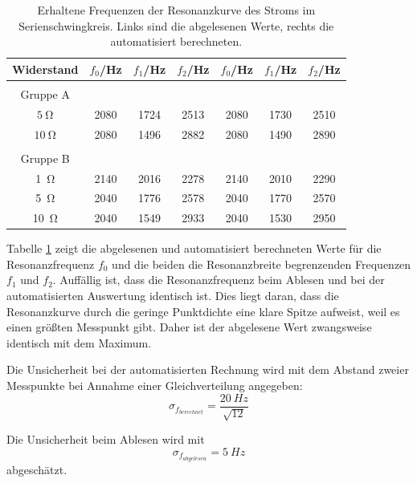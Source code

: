 \documentclass[12pt,a4paper]{article}
\begin{document}
\begin{table}
	\centering
	\begin{tabular}{|c|c|c|c||c|c|c|}
		\hline
		Widerstand & $f_0$/Hz & $f_1$/Hz & $f_2$/Hz & $f_0$/Hz & $f_1$/Hz & $f_2$/Hz \\
		\hline
		&&&&&&\\
		Gruppe A &&&&&&\\
		\hline
		$\SI{5}{\ohm}$ & 2080 & 1724 & 2513 & 2080 & 1730 & 2510 \\
		\hline
		$\SI{10}{\ohm}$ & 2080 & 1496 & 2882 & 2080 & 1490 & 2890 \\
		\hline
		&&&&&&\\
		Gruppe B &&&&&&\\
		\hline
		\SI{1}{\ohm} & 2140 & 2016 & 2278 & 2140 & 2010 & 2290 \\
		\hline
		\SI{5}{\ohm} & 2040 & 1776 & 2578 & 2040 & 1770 & 2570 \\
		\hline
		\SI{10}{\ohm} & 2040 & 1549 & 2933 & 2040 & 1530 & 2950 \\
		\hline
	\end{tabular}
	\caption{Erhaltene Frequenzen der Resonanzkurve des Stroms im Serienschwingkreis. Links sind die abgelesenen Werte, rechts die automatisiert berechneten.}
	\label{tab:StromResonanz}
\end{table}


Tabelle \ref{tab:StromResonanz} zeigt die abgelesenen und automatisiert berechneten Werte für die Resonanzfrequenz $f_0$ und die beiden die Resonanzbreite begrenzenden Frequenzen $f_1$ und $f_2$. Auffällig ist, dass die Resonanzfrequenz beim Ablesen und bei der automatisierten Auswertung identisch ist. Dies liegt daran, dass die Resonanzkurve durch die geringe Punktdichte eine klare Spitze aufweist, weil es einen größten Messpunkt gibt. Daher ist der abgelesene Wert zwangsweise identisch mit dem Maximum.



Die Unsicherheit bei der automatisierten Rechnung wird mit dem Abstand zweier Messpunkte bei Annahme einer Gleichverteilung angegeben:
\begin{equation*}
\sigma_{f_{berechnet}} = \dfrac{\SI{20}{Hz}}{\sqrt{12}}
\end{equation*}

Die Unsicherheit beim Ablesen wird mit 
\begin{equation*}
\sigma_{f_{abgelesen}} = \SI{5}{Hz}
\end{equation*}
abgeschätzt.\\
\end{document}
